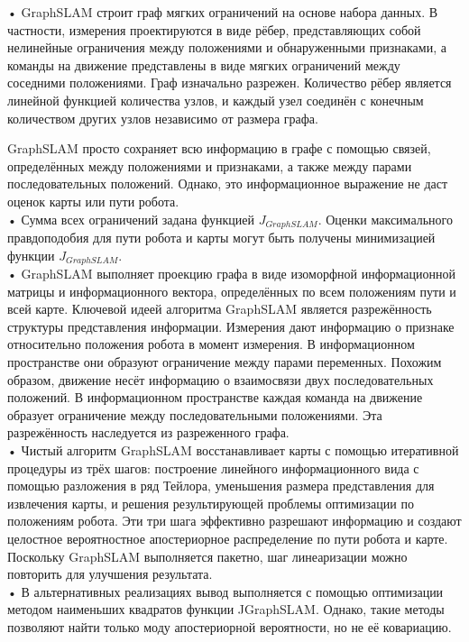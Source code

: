 \documentclass[10pt,a4paper]{article}
\begin{document}
•	GraphSLAM строит граф мягких ограничений на основе набора данных. В частности, измерения проектируются в виде рёбер, представляющих собой нелинейные ограничения между положениями и обнаруженными признаками, а команды на движение представлены в виде мягких ограничений между соседними положениями. Граф изначально разрежен. Количество рёбер является линейной функцией количества узлов, и каждый узел соединён с конечным количеством других узлов независимо от размера графа.

GraphSLAM просто сохраняет всю информацию в графе с помощью связей, определённых между положениями и признаками, а также между парами последовательных положений. Однако, это информационное выражение не даст оценок карты или пути робота.\\

•	Сумма всех ограничений задана функцией $J_{GraphSLAM}$. Оценки максимального правдоподобия для пути робота и карты могут быть получены минимизацией функции $J_{GraphSLAM}$.\\

•	GraphSLAM выполняет проекцию графа в виде изоморфной информационной матрицы и информационного вектора, определённых по всем положениям пути и всей карте. Ключевой идеей алгоритма GraphSLAM является разрежённость структуры представления информации. Измерения дают информацию о признаке относительно положения робота в момент измерения. В информационном пространстве они образуют ограничение между парами переменных. Похожим образом, движение несёт информацию о взаимосвязи двух последовательных положений. В информационном пространстве каждая команда на движение образует ограничение между последовательными положениями. Эта разрежённость наследуется из разреженного графа.\\

•	Чистый алгоритм GraphSLAM восстанавливает карты с помощью итеративной процедуры из трёх шагов: построение линейного информационного вида с помощью разложения в ряд Тейлора, уменьшения размера представления для извлечения карты, и решения результирующей проблемы оптимизации по положениям робота. Эти три шага эффективно разрешают информацию и создают целостное вероятностное апостериорное распределение по пути робота и карте. Поскольку GraphSLAM выполняется пакетно, шаг линеаризации можно повторить для улучшения результата.\\

•	В альтернативных реализациях  вывод выполняется с помощью оптимизации методом наименьших квадратов функции JGraphSLAM. Однако, такие методы позволяют найти только моду апостериорной вероятности, но не её ковариацию.\\
\end{document}
